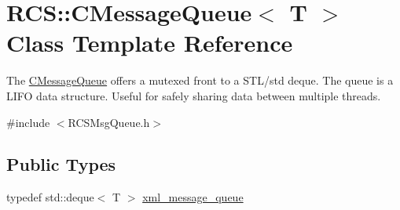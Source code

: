 \hypertarget{classRCS_1_1CMessageQueue}{\section{R\-C\-S\-:\-:C\-Message\-Queue$<$ T $>$ Class Template Reference}
\label{classRCS_1_1CMessageQueue}
}


The \hyperlink{classRCS_1_1CMessageQueue}{C\-Message\-Queue} offers a mutexed front to a S\-T\-L/std deque. The queue is a L\-I\-F\-O data structure. Useful for safely sharing data between multiple threads.  




{\ttfamily \#include $<$R\-C\-S\-Msg\-Queue.\-h$>$}

\subsection*{Public Types}
\begin{DoxyCompactItemize}
\item 
typedef std\-::deque$<$ T $>$ \hyperlink{classRCS_1_1CMessageQueue_a272ec6240c0ae616f66e71a033326e28}{xml\-\_\-message\-\_\-queue}
\end{DoxyCompactItemize}
